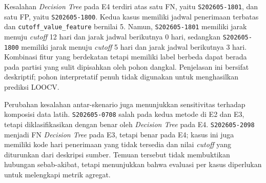 Kesalahan \textit{Decision Tree} pada E4 terdiri atas satu FN, yaitu \texttt{S202605-1801}, dan satu FP, yaitu \texttt{S202605-1800}. Kedua kasus memiliki jadwal penerimaan terbatas dan \texttt{cutoff\_value\_feature} bernilai 5. Namun, \texttt{S202605-1801} memiliki jarak menuju \textit{cutoff} 12 hari dan jarak jadwal berikutnya 0 hari, sedangkan \texttt{S202605-1800} memiliki jarak menuju \textit{cutoff} 5 hari dan jarak jadwal berikutnya 3 hari. Kombinasi fitur yang berdekatan tetapi memiliki label berbeda dapat berada pada partisi yang sulit dipisahkan oleh pohon dangkal. Penjelasan ini bersifat deskriptif; pohon interpretatif penuh tidak digunakan untuk menghasilkan prediksi LOOCV.

Perubahan kesalahan antar-skenario juga menunjukkan sensitivitas terhadap komposisi data latih. \texttt{S202605-0708} salah pada kedua metode di E2 dan E3, tetapi diklasifikasikan dengan benar oleh \textit{Decision Tree} pada E4. \texttt{S202605-2098} menjadi FN \textit{Decision Tree} pada E3, tetapi benar pada E4; kasus ini juga memiliki kode hari penerimaan yang tidak tersedia dan nilai \textit{cutoff} yang diturunkan dari deskripsi sumber. Temuan tersebut tidak membuktikan hubungan sebab-akibat, tetapi menunjukkan bahwa evaluasi per kasus diperlukan untuk melengkapi metrik agregat.

\FloatBarrier




